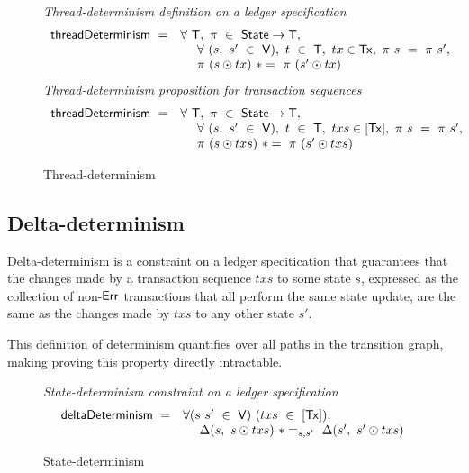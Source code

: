 \begin{figure*}[htb]
  \emph{Thread-determinism definition on a ledger specification}
  \begin{equation*}
    \begin{array}{l@{~~}l@{~~}ll}
    \fun{threadDeterminism} ~=~ & \forall~\T,~\pi~\in~\State \to \T, \\
    & ~~~~ \forall~(s,~s'~\in~\V),~t~\in~\T,~tx \in \Tx,~\pi~s~=~\pi~s', \\
    & ~~~~ \pi~(s\odot tx)~*=~\pi~(s'\odot tx)
    \end{array}
  \end{equation*}
  \emph{Thread-determinism proposition for transaction sequences}
  \begin{equation*}
    \begin{array}{l@{~~}l@{~~}ll}
    \fun{threadDeterminism} ~=~ & \forall~\T,~\pi~\in~\State \to \T, \\
    & ~~~~ \forall~(s,~s'~\in~\V),~t~\in~\T,~txs \in [\Tx],~\pi~s~=~\pi~s', \\
    & ~~~~ \pi~(s\odot txs)~*=~\pi~(s'\odot txs)~\\
    \end{array}
  \end{equation*}
  \caption{Thread-determinism}
  \label{fig:thread-det}
\end{figure*}

\subsection{Delta-determinism}
\label{sec:delta-det}

Delta-determinism is a constraint on a ledger specitication that guarantees that
the changes made by a transaction sequence $txs$ to some state $s$, expressed as
the collection of non-$\mathsf{Err}$ transactions that all perform the same state update,
are the same as the changes made by $txs$ to any other state $s'$.

This definition of determinism quantifies over all paths in the transition
graph, making proving this property directly intractable.

\begin{figure*}[htb]
  \emph{State-determinism constraint on a ledger specification}
  \begin{equation*}
    \begin{array}{l@{~~}l@{~~}ll}
    \fun{deltaDeterminism} ~=~ & \forall (s~s'~\in~\V)~(txs~\in~[\Tx]),~\\
    & ~~~~ \Delta (s,~s\odot txs)~*=_{s,s'}~\Delta (s',~s'\odot txs)
    \end{array}
  \end{equation*}
  \caption{State-determinism}
  \label{fig:delta-det}
\end{figure*}

